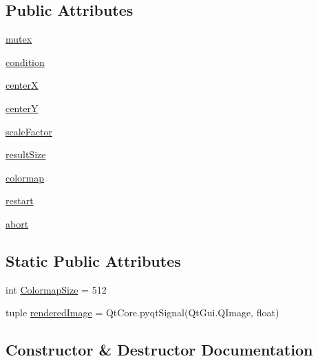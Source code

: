 \subsection*{Public Attributes}
\begin{DoxyCompactItemize}
\item 
\hyperlink{classmandelbrot_1_1RenderThread_aba3f6009ad0b7701fbf2a595c805d956}{mutex}
\item 
\hyperlink{classmandelbrot_1_1RenderThread_a9315c79bac650966d0803e79ec148590}{condition}
\item 
\hyperlink{classmandelbrot_1_1RenderThread_a2605666e18286ef4614570905f5d9346}{center\+X}
\item 
\hyperlink{classmandelbrot_1_1RenderThread_a57065910d7039b2914a805c57d548af3}{center\+Y}
\item 
\hyperlink{classmandelbrot_1_1RenderThread_a1ed90d726ea886b5b9c6c5fd58eece84}{scale\+Factor}
\item 
\hyperlink{classmandelbrot_1_1RenderThread_a663e6420fadb40b7c820b9e8087e95a6}{result\+Size}
\item 
\hyperlink{classmandelbrot_1_1RenderThread_a1c0fe3e3f1bf38421c632e7b680baf1c}{colormap}
\item 
\hyperlink{classmandelbrot_1_1RenderThread_a0f46a2340aab9e04593e8a6f882a02b1}{restart}
\item 
\hyperlink{classmandelbrot_1_1RenderThread_a5c286700fff5badbd95cf21914b6dd13}{abort}
\end{DoxyCompactItemize}
\subsection*{Static Public Attributes}
\begin{DoxyCompactItemize}
\item 
int \hyperlink{classmandelbrot_1_1RenderThread_a77f89dfa562101c03e39ea8ddd38b36d}{Colormap\+Size} = 512
\item 
tuple \hyperlink{classmandelbrot_1_1RenderThread_aa91f2aedf998232df81073d6f6e55d4d}{rendered\+Image} = Qt\+Core.\+pyqt\+Signal(Qt\+Gui.\+Q\+Image, float)
\end{DoxyCompactItemize}


\subsection{Constructor \& Destructor Documentation}
\hypertarget{classmandelbrot_1_1RenderThread_a91cb8115c27d80df34f304032ca53467}{}
